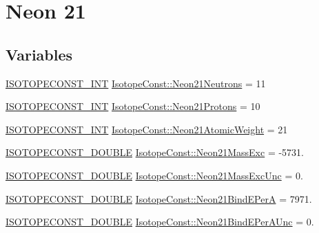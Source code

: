 \hypertarget{group___isotope_const-_neon-_ne21}{}\section{Neon 21}
\label{group___isotope_const-_neon-_ne21}
\subsection*{Variables}
\begin{DoxyCompactItemize}
\item 
\mbox{\hyperlink{group___isotope_const-_macros_ga5f18360b3e99483a35c32d789e62621c}{I\+S\+O\+T\+O\+P\+E\+C\+O\+N\+S\+T\+\_\+\+I\+NT}} \mbox{\hyperlink{group___isotope_const-_neon-_ne21_gaab2a4623ba557c8ef7cc84a43a484f26}{Isotope\+Const\+::\+Neon21\+Neutrons}} = 11
\item 
\mbox{\hyperlink{group___isotope_const-_macros_ga5f18360b3e99483a35c32d789e62621c}{I\+S\+O\+T\+O\+P\+E\+C\+O\+N\+S\+T\+\_\+\+I\+NT}} \mbox{\hyperlink{group___isotope_const-_neon-_ne21_ga112a111084ec18d0de281a2fda454608}{Isotope\+Const\+::\+Neon21\+Protons}} = 10
\item 
\mbox{\hyperlink{group___isotope_const-_macros_ga5f18360b3e99483a35c32d789e62621c}{I\+S\+O\+T\+O\+P\+E\+C\+O\+N\+S\+T\+\_\+\+I\+NT}} \mbox{\hyperlink{group___isotope_const-_neon-_ne21_gaf8c7997ad769bca85c2af3d4b393e5b0}{Isotope\+Const\+::\+Neon21\+Atomic\+Weight}} = 21
\item 
\mbox{\hyperlink{group___isotope_const-_macros_ga8f45a7272ce02c0b4c65c44636ed719a}{I\+S\+O\+T\+O\+P\+E\+C\+O\+N\+S\+T\+\_\+\+D\+O\+U\+B\+LE}} \mbox{\hyperlink{group___isotope_const-_neon-_ne21_ga76d32f098400ad56b19a82692854cae7}{Isotope\+Const\+::\+Neon21\+Mass\+Exc}} = -\/5731.
\item 
\mbox{\hyperlink{group___isotope_const-_macros_ga8f45a7272ce02c0b4c65c44636ed719a}{I\+S\+O\+T\+O\+P\+E\+C\+O\+N\+S\+T\+\_\+\+D\+O\+U\+B\+LE}} \mbox{\hyperlink{group___isotope_const-_neon-_ne21_ga55832426d5479ef136377abf9dcdfa2d}{Isotope\+Const\+::\+Neon21\+Mass\+Exc\+Unc}} = 0.
\item 
\mbox{\hyperlink{group___isotope_const-_macros_ga8f45a7272ce02c0b4c65c44636ed719a}{I\+S\+O\+T\+O\+P\+E\+C\+O\+N\+S\+T\+\_\+\+D\+O\+U\+B\+LE}} \mbox{\hyperlink{group___isotope_const-_neon-_ne21_gae91630624113d72de2e8ad7753500b18}{Isotope\+Const\+::\+Neon21\+Bind\+E\+PerA}} = 7971.
\item 
\mbox{\hyperlink{group___isotope_const-_macros_ga8f45a7272ce02c0b4c65c44636ed719a}{I\+S\+O\+T\+O\+P\+E\+C\+O\+N\+S\+T\+\_\+\+D\+O\+U\+B\+LE}} \mbox{\hyperlink{group___isotope_const-_neon-_ne21_ga054fe4fc00c23918d07839628f46ed7d}{Isotope\+Const\+::\+Neon21\+Bind\+E\+Per\+A\+Unc}} = 0.

\end{DoxyCompactItemize}
